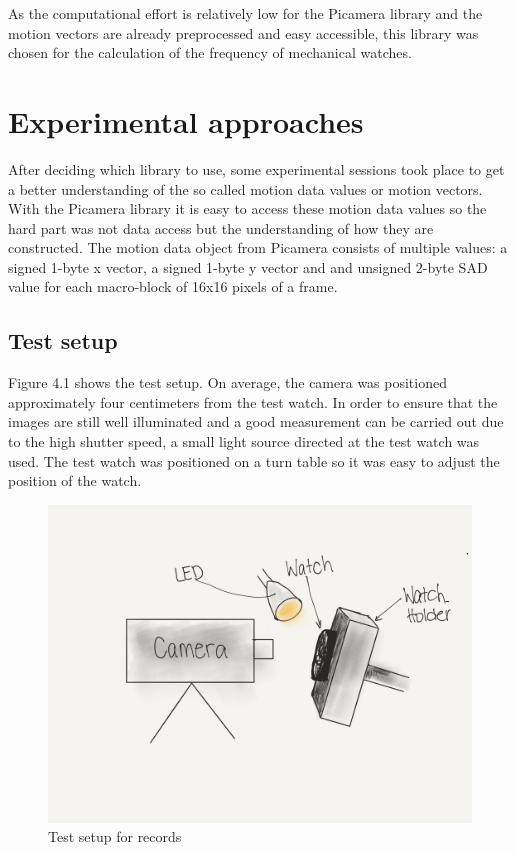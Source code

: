 \documentclass[12pt, a4paper]{report}
\begin{document}
    As the computational effort is relatively low for the Picamera library and the motion vectors are already preprocessed and easy accessible, this library was chosen for the calculation of the frequency of mechanical watches.

    \chapter {Experimental approaches}

    After deciding which library to use, some experimental sessions took place to get a better understanding of the so called motion data values or motion vectors. 
    With the Picamera library it is easy to access these motion data values so the hard part was not data access but the understanding of how they are constructed. 
    The motion data object from Picamera consists of multiple values: a signed 1-byte x vector, a signed 1-byte y vector and and unsigned 2-byte SAD value for each macro-block of 16x16 pixels of a frame.
    
   \section{Test setup}
   
Figure 4.1 shows the test setup. On average, the camera was positioned approximately four centimeters from the test watch. In order to ensure that the images are still well illuminated and a good measurement can be carried out due to the high shutter speed, a small light source directed at the test watch was used. The test watch was positioned on a turn table so it was easy to adjust the position of the watch.

      \begin{figure}[H]
        \centering
        \includegraphics[scale=0.3]{Images/test_setup}
        
        \caption{Test setup for records}
        \end{figure}
        
\end{document}
